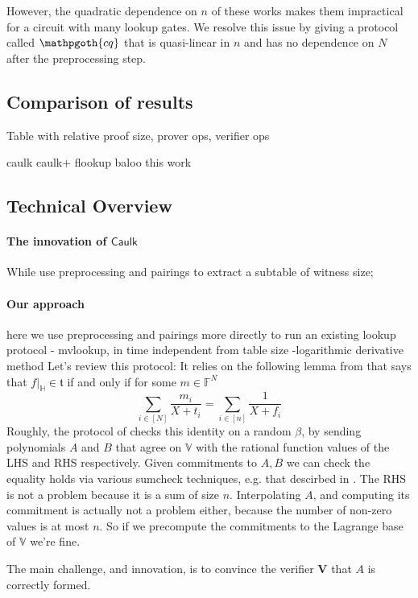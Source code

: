 \documentclass[11pt]{article} %
\newcommand{\cq}{\ensuremath{\mathpgoth{cq} }\xspace}
\newcommand{\caulk}{\ensuremath{\mathsf{Caulk}}\xspace}
\newcommand{\F}{\ensuremath{\mathbb F}\xspace}
\newcommand{\ver}{\ensuremath{\mathsf{\mathbf{V}}}\xspace}
\newcommand{\sumi}[1]{\sum_{i\in[#1]}}
\newcommand{\restricttoset}[2]{\ensuremath{#1|_{#2}}\xspace}
\newcommand{\subspace}{\ensuremath{\mathbb{H}}\xspace}
\newcommand{\bigspace}{\ensuremath{\mathbb{V}}\xspace}
\newcommand{\witsize}{\ensuremath{n}\xspace}
\newcommand{\tabsize}{\ensuremath{N}\xspace}
\newcommand{\tab}{\ensuremath{\mathfrak{t}}\xspace}
\begin{document}
However, the quadratic dependence on \witsize  of these works makes them impractical for a circuit with many lookup gates.
We resolve this issue by giving a protocol called \cq that is quasi-linear in \witsize and has no dependence on \tabsize after the preprocessing step.

\subsection{Comparison of results}

Table with relative proof size, prover ops, verifier ops

caulk
caulk+
flookup
baloo
this work

\subsection{Technical Overview}
\paragraph{The innovation of \caulk }
While \cite{caulk,caulkp,flookup,baloo} use preprocessing and pairings to extract a subtable of witness size;


\paragraph{Our approach}
here we use preprocessing and pairings more directly to run an existing lookup protocol - mvlookup,
in time independent from table size
-logarithmic derivative method
Let's review this protocol:
It relies on the following lemma from \cite{mvlookup}
that says that $\restricttoset{f}{\subspace}\in \tab$ if and only if for some $m\in \F^\tabsize$
 \[\sumi{\tabsize}\frac{m_i}{X+t_i}=\sumi{\witsize}\frac{1}{X+f_i}\]
Roughly, the protocol of \cite{mvlookup} checks this identity on a random $\beta$,
by sending polynomials $A$ and $B$ that agree on \bigspace with the rational function values of the LHS and RHS
respectively.
Given commitments to $A,B$ we can check the equality holds via various sumcheck techniques, e.g. that descirbed in \cite{aurora}.
The RHS is not a problem because it is a sum of size \witsize.
Interpolating $A$, and computing its commitment is actually not a problem either, because the number of non-zero values
is at most \witsize. So if we precompute the commitments to the Lagrange base of  \bigspace we're fine.

The main challenge, and innovation, is to convince the verifier \ver that $A$ is correctly formed.
\end{document}
